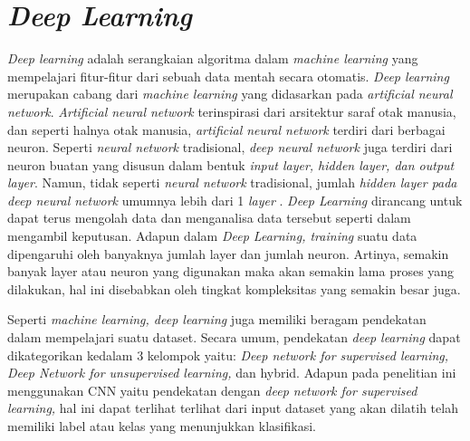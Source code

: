 \section{\textit{Deep Learning}}
\label{sec:deeplearning}
\textit{Deep learning} adalah serangkaian algoritma dalam \textit{machine learning} yang mempelajari fitur-fitur dari sebuah data mentah secara otomatis. \textit{Deep learning} merupakan cabang dari \textit{machine learning} yang didasarkan pada \textit{artificial neural network}. \textit{Artificial neural network} terinspirasi dari arsitektur saraf otak manusia, dan seperti halnya otak manusia, \textit{artificial neural network} terdiri dari berbagai neuron. Seperti \textit{neural network} tradisional, \textit{deep neural network} juga terdiri dari neuron buatan yang disusun dalam bentuk \textit{input layer, hidden layer, \textnormal{dan} output layer}. Namun, tidak seperti \textit{neural network} tradisional, jumlah \textit{hidden layer \textnormal{pada} deep neural network} umumnya lebih dari 1 \textit{layer} \citep*{ahmad2019deep}. 
\textit{Deep Learning} dirancang untuk dapat terus mengolah data dan menganalisa data tersebut seperti dalam mengambil keputusan. 
Adapun dalam \textit{Deep Learning, training} suatu data dipengaruhi oleh banyaknya jumlah layer dan jumlah neuron. Artinya, semakin banyak layer atau neuron yang digunakan maka akan semakin lama proses yang dilakukan, hal ini disebabkan oleh tingkat kompleksitas yang semakin besar juga. \par

Seperti \textit{machine learning, deep learning} juga memiliki beragam pendekatan dalam mempelajari suatu dataset. Secara umum, pendekatan \textit{deep learning} dapat dikategorikan kedalam 3 kelompok yaitu: \textit{Deep network for supervised learning, Deep Network for unsupervised learning,} dan hybrid. 
Adapun pada penelitian ini menggunakan CNN yaitu pendekatan dengan \textit{deep network for supervised learning,} hal ini dapat terlihat terlihat dari input dataset yang akan dilatih telah memiliki label atau kelas yang menunjukkan klasifikasi.
\par

